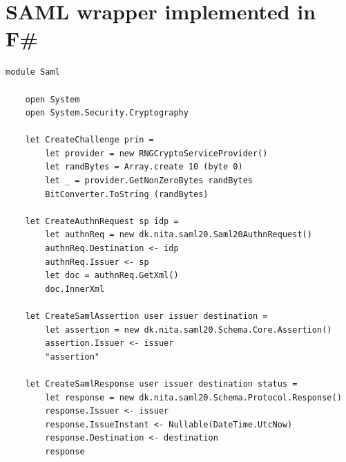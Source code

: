 \documentclass[twosided]{report}
\begin{document}
\section{SAML wrapper implemented in F\#}
\begin{lstlisting}[style=fstar, caption={[Example of implementation of SAML functions in F\#]Example of implementation of SAML functions in F\# \cite{jacob}.}]
	module Saml

	open System
	open System.Security.Cryptography
	
	let CreateChallenge prin = 
		let provider = new RNGCryptoServiceProvider()
		let randBytes = Array.create 10 (byte 0)
		let _ = provider.GetNonZeroBytes randBytes
		BitConverter.ToString (randBytes)
	
	let CreateAuthnRequest sp idp = 
		let authnReq = new dk.nita.saml20.Saml20AuthnRequest()
		authnReq.Destination <- idp
		authnReq.Issuer <- sp
		let doc = authnReq.GetXml()
		doc.InnerXml
	
	let CreateSamlAssertion user issuer destination = 
		let assertion = new dk.nita.saml20.Schema.Core.Assertion()
		assertion.Issuer <- issuer
		"assertion"
	
	let CreateSamlResponse user issuer destination status =
		let response = new dk.nita.saml20.Schema.Protocol.Response()
		response.Issuer <- issuer
		response.IssueInstant <- Nullable(DateTime.UtcNow)
		response.Destination <- destination
		response
\end{lstlisting}
\clearpage
\end{document}
